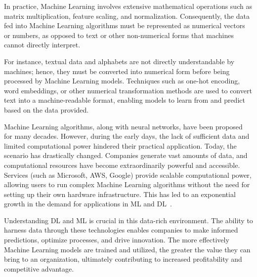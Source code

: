 \documentclass[12pt,a4paper]{report}
\begin{document}
In practice, Machine Learning involves extensive mathematical operations such as matrix multiplication, feature scaling, and normalization. Consequently, the data fed into Machine Learning algorithms must be represented as numerical vectors or numbers, as opposed to text or other non-numerical forms that machines cannot directly interpret.

For instance, textual data and alphabets are not directly understandable by machines; hence, they must be converted into numerical form before being processed by Machine Learning models. Techniques such as one-hot encoding, word embeddings, or other numerical transformation methods are used to convert text into a machine-readable format, enabling models to learn from and predict based on the data provided.

Machine Learning algorithms, along with neural networks, have been proposed for many decades. However, during the early days, the lack of sufficient data and limited computational power hindered their practical application. Today, the scenario has drastically changed. Companies generate vast amounts of data, and computational resources have become extraordinarily powerful and accessible. Services (such as Microsoft, AWS, Google) provide scalable computational power, allowing users to run complex Machine Learning algorithms without the need for setting up their own hardware infrastructure. This has led to an exponential growth in the demand for applications in ML and DL~\cite{machinelearning}.

Understanding DL and ML is crucial in this data-rich environment. The ability to harness data through these technologies enables companies to make informed predictions, optimize processes, and drive innovation. The more effectively Machine Learning models are trained and utilized, the greater the value they can bring to an organization, ultimately contributing to increased profitability and competitive advantage.
\end{document}
